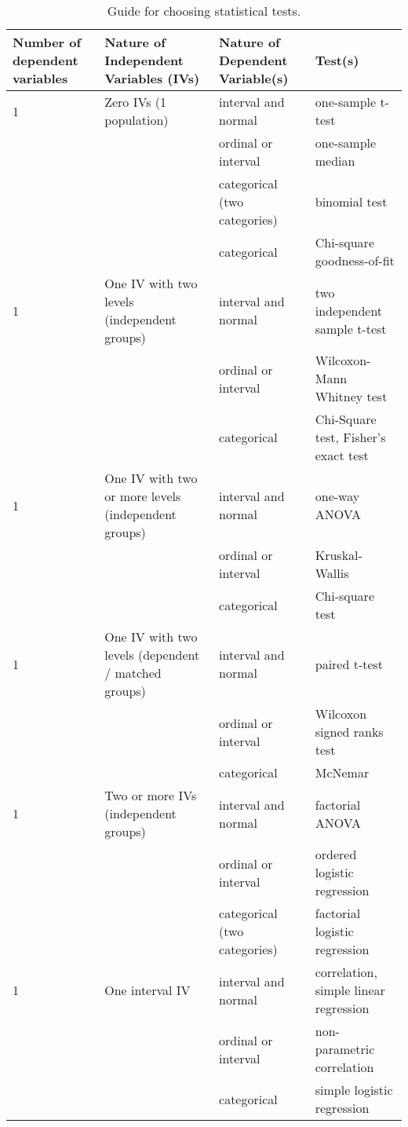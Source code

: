 \documentclass[letterpaper, 10 pt, conference]{article}
\begin{document}
\begin{table}
	\centering
	\caption{Guide for choosing statistical tests.}
	\begin{tabular}{p{} | p{} | p{} | p{}}
		\hline
		Number of dependent variables & Nature of Independent Variables (IVs) & Nature of Dependent Variable(s) & Test(s) \\
		\hline
		1 & Zero IVs (1 population) & interval and normal & one-sample t-test \\
		 & & ordinal or interval & one-sample median \\
		 & & categorical (two categories) & binomial test \\
		 & & categorical & Chi-square goodness-of-fit \\
		\hline
		1 & One IV with two levels (independent groups) & interval and normal & two independent sample t-test \\
		 & & ordinal or interval & Wilcoxon-Mann Whitney test\\
		 & & categorical & Chi-Square test, Fisher's exact test \\
		\hline
		1 & One IV with two or more levels (independent groups) & interval and normal & one-way ANOVA\\
		 & &ordinal or interval & Kruskal-Wallis \\
		 & & categorical & Chi-square test\\
		\hline
		1 & One IV with two levels (dependent / matched groups) & interval and normal & paired t-test \\
		 & & ordinal or interval & Wilcoxon signed ranks test \\
		 & & categorical & McNemar \\
		 \hline
		 1 & Two or more IVs (independent groups)  & interval and normal & factorial ANOVA\\
		  & & ordinal or interval & ordered logistic regression \\
		  & & categorical (two categories) & factorial logistic regression\\
		 \hline 
		 1 & One interval IV & interval and normal & correlation, simple linear regression \\
		 & & ordinal or interval & non-parametric correlation \\
		 & & categorical & simple logistic regression\\
		 \hline
	\end{tabular}
\label{tab:guide}
\end{table}






\end{document}
